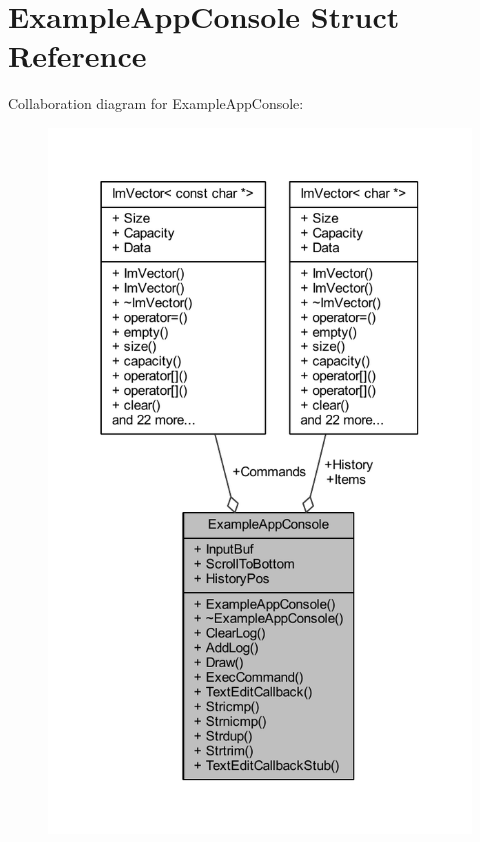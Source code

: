 \hypertarget{struct_example_app_console}{}\section{Example\+App\+Console Struct Reference}
\label{struct_example_app_console}


Collaboration diagram for Example\+App\+Console\+:
\nopagebreak
\begin{figure}[H]
\begin{center}
\leavevmode
\includegraphics[width=318pt]{struct_example_app_console__coll__graph}
\end{center}
\end{figure}
